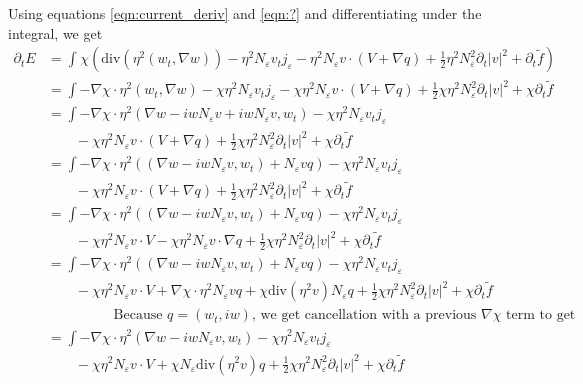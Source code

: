 \documentclass[a4paper]{article}
\renewcommand{\div}{\mathrm{div}}
\begin{document}
Using equations \eqref{eqn:current_deriv} and \eqref{eqn:?} and differentiating under the integral, we get
\begin{align}
  \partial_t E &= \int_{}^{} \chi \left( \div(\eta^2 (w_t, \nabla w)) - \eta^2 N_\varepsilon v_t j_\varepsilon - \eta^2 N_\varepsilon v \cdot (V + \nabla q) +
  \frac{1}{2} \eta^2 N_\varepsilon^2 \partial_t |v|^2 + \partial_t \tilde{f} \right) \nonumber \\
  &= \int - \nabla \chi \cdot \eta^2 (w_t, \nabla w) - \chi \eta^2 N_\varepsilon v_t j_\varepsilon - \chi \eta^2 N_\varepsilon v \cdot (V + \nabla q)
  + \frac{1}{2} \chi \eta^2 N_\varepsilon^2 \partial_t |v|^2 + \chi \partial_t \tilde{f} \nonumber \\
  &= \int - \nabla \chi \cdot \eta^2 ( \nabla w - i w N_\varepsilon v + i w N_\varepsilon v, w_t) - \chi \eta^2 N_\varepsilon v_t j_\varepsilon
  \nonumber \\
  &\quad \quad - \chi \eta^2 N_\varepsilon v \cdot (V + \nabla q) + \frac{1}{2} \chi \eta^2 N_\varepsilon^2 \partial_t |v|^2 + \chi \partial_t \tilde{f} \nonumber \\
  &= \int - \nabla \chi \cdot \eta^2 \left( (\nabla w - iw N_\varepsilon v, w_t) + N_\varepsilon v q \right) - \chi \eta^2
  N_\varepsilon v_t j_\varepsilon \nonumber \\
  &\quad \quad - \chi \eta^2 N_\varepsilon v \cdot (V+\nabla q) + \frac{1}{2} \chi \eta^2 N_\varepsilon^2 \partial_t |v|^2 + \chi \partial_t \tilde{f} \nonumber \\
  &= \int - \nabla \chi \cdot \eta^2 ( (\nabla w - iw N_\varepsilon v, w_t) + N_\varepsilon v q ) - \chi \eta^2 N_\varepsilon v_t j_\varepsilon
  \nonumber \\
  &\quad \quad - \chi \eta^2 N_\varepsilon v \cdot V - \chi \eta^2 N_\varepsilon v \cdot \nabla q + \frac{1}{2} \chi \eta^2 N_\varepsilon^2 \partial_t |v|^2 + \chi \partial_t \tilde{f}
  \nonumber \\
  &= \int - \nabla \chi \cdot \eta^2 ( ( \nabla w - i w N_\varepsilon v, w_t) + N_\varepsilon v q ) - \chi \eta^2 N_\varepsilon v_t
  j_\varepsilon \nonumber \\
  &\quad \quad - \chi \eta^2 N_\varepsilon v \cdot V + \nabla \chi \cdot \eta^2 N_\varepsilon v q + \chi \div (\eta^2 v) N_\varepsilon q
  + \frac{1}{2} \chi \eta^2 N_\varepsilon^2 \partial_t |v|^2 + \chi \partial_t \tilde{f} \nonumber \\
  &\hspace{2cm} \text{Because } q = (w_t, iw) \text{, we get cancellation with a previous $\nabla \chi$ term to get} \nonumber \\
  &= \int - \nabla \chi \cdot \eta^2 ( \nabla w - iw N_\varepsilon v, w_t) - \chi \eta^2 N_\varepsilon v_t j_\varepsilon \nonumber \\
  &\quad \quad - \chi \eta^2 N_\varepsilon v \cdot V + \chi N_\varepsilon \div (\eta^2 v) q +
  \frac{1}{2} \chi \eta^2 N_\varepsilon^2 \partial_t |v|^2 + \chi \partial_t \tilde{f}
  \label{eqn:energy_deriv}
\end{align}
\end{document}
